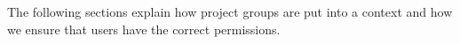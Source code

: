 The following sections explain how project groups are put into a \moodle{} context and how we ensure that users have the correct permissions.


\FloatBarrier


\FloatBarrier











